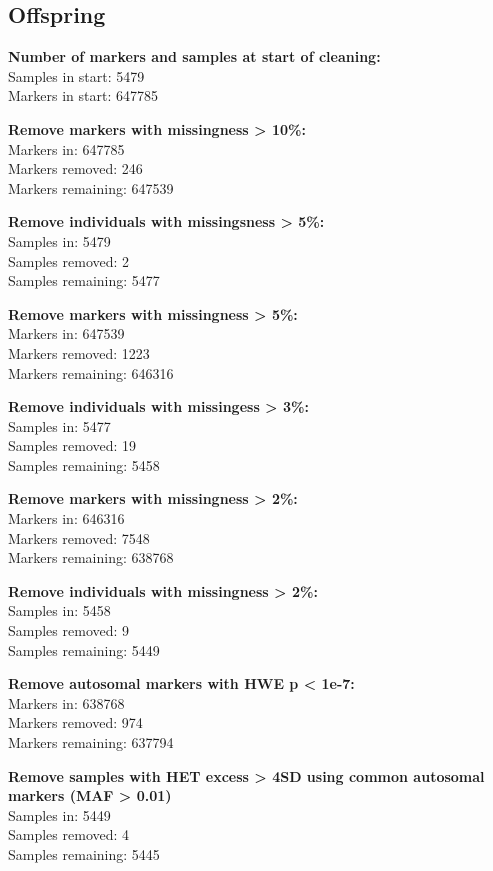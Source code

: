 \documentclass[]{article}
\begin{document}
\subsection{Offspring}\label{offspring}

\textbf{Number of markers and samples at start of cleaning:}\\
Samples in start: 5479\\
Markers in start: 647785

\textbf{Remove markers with missingness \textgreater{} 10\%:}\\
Markers in: 647785\\
Markers removed: 246\\
Markers remaining: 647539

\textbf{Remove individuals with missingsness \textgreater{} 5\%:}\\
Samples in: 5479\\
Samples removed: 2\\
Samples remaining: 5477

\textbf{Remove markers with missingness \textgreater{} 5\%:}\\
Markers in: 647539\\
Markers removed: 1223\\
Markers remaining: 646316

\textbf{Remove individuals with missingess \textgreater{} 3\%:}\\
Samples in: 5477\\
Samples removed: 19\\
Samples remaining: 5458

\textbf{Remove markers with missingness \textgreater{} 2\%:}\\
Markers in: 646316\\
Markers removed: 7548\\
Markers remaining: 638768

\textbf{Remove individuals with missingness \textgreater{} 2\%:}\\
Samples in: 5458\\
Samples removed: 9\\
Samples remaining: 5449

\textbf{Remove autosomal markers with HWE p \textless{} 1e-7:}\\
Markers in: 638768\\
Markers removed: 974\\
Markers remaining: 637794

\textbf{Remove samples with HET excess \textgreater{} 4SD using common
autosomal markers (MAF \textgreater{} 0.01)}\\
Samples in: 5449\\
Samples removed: 4\\
Samples remaining: 5445
\end{document}
